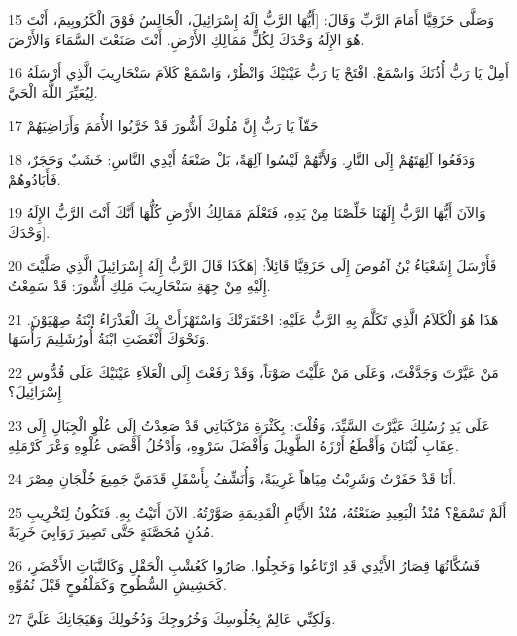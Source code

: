 \par 15 وَصَلَّى حَزَقِيَّا أَمَامَ الرَّبِّ وَقَالَ: [أَيُّهَا الرَّبُّ إِلَهُ إِسْرَائِيلَ، الْجَالِسُ فَوْقَ الْكَرُوبِيمَ، أَنْتَ هُوَ الإِلَهُ وَحْدَكَ لِكُلِّ مَمَالِكِ الأَرْضِ. أَنْتَ صَنَعْتَ السَّمَاءَ وَالأَرْضَ.
\par 16 أَمِلْ يَا رَبُّ أُذُنَكَ وَاسْمَعْ. افْتَحْ يَا رَبُّ عَيْنَيْكَ وَانْظُرْ، وَاسْمَعْ كَلاَمَ سَنْحَارِيبَ الَّذِي أَرْسَلَهُ لِيُعَيِّرَ اللَّهَ الْحَيَّ.
\par 17 حَقّاً يَا رَبُّ إِنَّ مُلُوكَ أَشُّورَ قَدْ خَرَّبُوا الأُمَمَ وَأَرَاضِيَهُمْ
\par 18 وَدَفَعُوا آلِهَتَهُمْ إِلَى النَّارِ. وَلأَنَّهُمْ لَيْسُوا آلِهَةً، بَلْ صَنْعَةُ أَيْدِي النَّاسِ: خَشَبٌ وَحَجَرٌ، فَأَبَادُوهُمْ.
\par 19 وَالآنَ أَيُّهَا الرَّبُّ إِلَهُنَا خَلِّصْنَا مِنْ يَدِهِ، فَتَعْلَمَ مَمَالِكُ الأَرْضِ كُلُّهَا أَنَّكَ أَنْتَ الرَّبُّ الإِلَهُ وَحْدَكَ].
\par 20 فَأَرْسَلَ إِشَعْيَاءُ بْنُ آمُوصَ إِلَى حَزَقِيَّا قَائِلاً: [هَكَذَا قَالَ الرَّبُّ إِلَهُ إِسْرَائِيلَ الَّذِي صَلَّيْتَ إِلَيْهِ مِنْ جِهَةِ سَنْحَارِيبَ مَلِكِ أَشُّورَ: قَدْ سَمِعْتُ.
\par 21 هَذَا هُوَ الْكَلاَمُ الَّذِي تَكَلَّمَ بِهِ الرَّبُّ عَلَيْهِ: احْتَقَرَتْكَ وَاسْتَهْزَأَتْ بِكَ الْعَذْرَاءُ ابْنَةُ صِهْيَوْنَ. وَنَحْوَكَ أَنْغَضَتِ ابْنَةُ أُورُشَلِيمَ رَأْسَهَا.
\par 22 مَنْ عَيَّرْتَ وَجَدَّفْتَ، وَعَلَى مَنْ عَلَّيْتَ صَوْتاً، وَقَدْ رَفَعْتَ إِلَى الْعَلاَءِ عَيْنَيْكَ عَلَى قُدُّوسِ إِسْرَائِيلَ؟
\par 23 عَلَى يَدِ رُسُلِكَ عَيَّرْتَ السَّيِّدَ، وَقُلْتَ: بِكَثْرَةِ مَرْكَبَاتِي قَدْ صَعِدْتُ إِلَى عُلْوِ الْجِبَالِ إِلَى عِقَابِ لُبْنَانَ وَأَقْطَعُ أَرْزَهُ الطَّوِيلَ وَأَفْضَلَ سَرْوِهِ، وَأَدْخُلُ أَقْصَى عُلْوِهِ وَعْرَ كَرْمَلِهِ.
\par 24 أَنَا قَدْ حَفَرْتُ وَشَرِبْتُ مِيَاهاً غَرِيبَةً، وَأُنَشِّفُ بِأَسْفَلِ قَدَمَيَّ جَمِيعَ خُلْجَانِ مِصْرَ.
\par 25 أَلَمْ تَسْمَعْ؟ مُنْذُ الْبَعِيدِ صَنَعْتُهُ، مُنْذُ الأَيَّامِ الْقَدِيمَةِ صَوَّرْتُهُ. الآنَ أَتَيْتُ بِهِ. فَتَكُونُ لِتَخْرِيبِ مُدُنٍ مُحَصَّنَةٍ حَتَّى تَصِيرَ رَوَابِيَ خَرِبَةً.
\par 26 فَسُكَّانُهَا قِصَارُ الأَيْدِي قَدِ ارْتَاعُوا وَخَجِلُوا. صَارُوا كَعُشْبِ الْحَقْلِ وَكَالنَّبَاتِ الأَخْضَرِ، كَحَشِيشِ السُّطُوحِ وَكَمَلْفُوحٍ قَبْلَ نُمُوِّهِ.
\par 27 وَلَكِنِّي عَالِمٌ بِجُلُوسِكَ وَخُرُوجِكَ وَدُخُولِكَ وَهَيَجَانِكَ عَلَيَّ.
